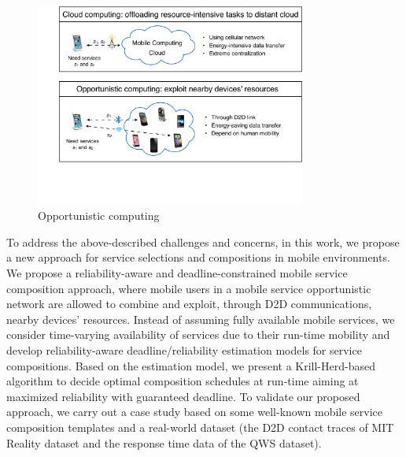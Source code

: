 \documentclass[journal]{IEEEtran}
\begin{document}
\begin{figure}[!t]
\centering
\includegraphics[width=3.5in]{./img/pic1.pdf}
\caption{Opportunistic computing}
\label{Opportunistic computing}
\end{figure}



To address the above-described challenges and concerns, in this work, we propose a new approach for service selections and compositions in mobile environments. We propose a reliability-aware and deadline-constrained mobile service composition approach, where mobile users in a mobile service opportunistic network are allowed to combine and exploit, through D2D communications, nearby devices' resources. Instead of assuming fully available mobile services, we consider time-varying availability of services due to their run-time mobility and develop reliability-aware deadline/reliability estimation models for service compositions. Based on the estimation model, we present a Krill-Herd-based algorithm to decide optimal composition schedules at run-time aiming at maximized reliability with guaranteed deadline. To validate our proposed approach, we carry out a case study based on some well-known mobile service composition templates and a real-world dataset (the D2D contact traces of MIT Reality dataset and the response time data of the QWS dataset).
\end{document}
